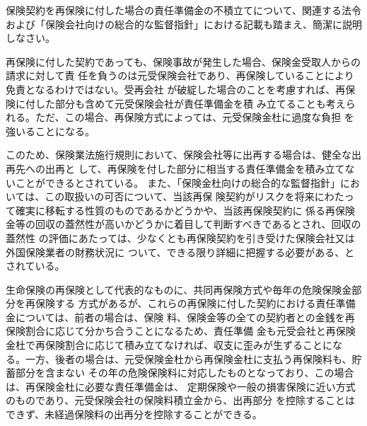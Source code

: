 \documentclass[report,gutter=10mm,fore-edge=10mm,uplatex,dvipdfmx]{jlreq}
\begin{document}
保険契約を再保険に付した場合の責任準備金の不積立てについて、関連する法令および「保険会社向けの総合的な監督指針」における記載も踏まえ、簡潔に説明しなさい。

\answer{}
再保険に付した契約であっても、保険事故が発生した場合、保険金受取人からの請求に対して責
任を負うのは元受保険会社であり、再保険していることにより免責となるわけではない。受再会社
が破綻した場合のことを考慮すれば、再保険に付した部分も含めて元受保険会社が責任準備金を積
み立てることも考えられる。ただ、この場合、再保険方式によっては、元受保険金杜に過度な負担
を強いることになる。

このため、保険業法施行規則において、保険会社等に出再する場合は、健全な出再先への出再と
して、再保険を付した部分に相当する責任準備金を積み立てないことができるとされている。
また、「保険金杜向けの総合的な監督指針」においては、この取扱いの可否について、当該再保
険契約がリスクを将来にわたって確実に移転する性質のものであるかどうかや、当該再保険契約に
係る再保険金等の回収の蓋然性が高いかどうかに着目して判断すべきであるとされ、回収の蓋然性
の評価にあたっては、少なくとも再保険契約を引き受けた保険会社又は外国保険業者の財務状況に
ついて、できる限り詳細に把握する必要がある、とされている。

生命保険の再保険として代表的なものに、共同再保険方式や毎年の危険保険金部分を再保険する
方式があるが、これらの再保険に付した契約における責任準備金については、前者の場合は、保険
料、保険金等の全ての契約者との金銭を再保険割合に応じて分かち合うことになるため、責任準備
金も元受会社と再保険金杜で再保険割合に応じて積み立てなければ、収支に歪みが生ずることにな
る。一方、後者の場合は、元受保険金杜から再保険金杜に支払う再保険料も、貯蓄部分を含まない
その年の危険保険料に対応したものとなっており、この場合は、再保険金杜に必要な責任準備金は、
定期保険や一般の損害保険に近い方式のものであり、元受保険会社の保険料積立金から、出再部分
を控除することはできず、未経過保険料の出再分を控除することができる。

\end{document}
